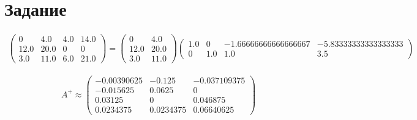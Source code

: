 \section{Задание}

\begin{gather}
    \begin{pmatrix} 
        0 & 4.0 & 4.0 & 14.0 \\ 
        12.0 & 20.0 & 0 & 0 \\ 
        3.0 & 11.0 & 6.0 & 21.0
    \end{pmatrix}
    =
    \begin{pmatrix} 
        0 & 4.0 \\ 
        12.0 & 20.0 \\ 
        3.0 & 11.0
    \end{pmatrix}
    \begin{pmatrix} 
        1.0 & 0 & -1.66666666666666667 & -5.83333333333333333 \\ 
        0 & 1.0 & 1.0 & 3.5
    \end{pmatrix}
\end{gather}

\begin{gather}
    A^+
    \approx
    \begin{pmatrix} 
        -0.00390625 & -0.125 & -0.037109375 \\ 
        -0.015625 & 0.0625 & 0 \\ 
        0.03125 & 0 & 0.046875 \\ 
        0.0234375 & 0.0234375 & 0.06640625
    \end{pmatrix}
\end{gather}



